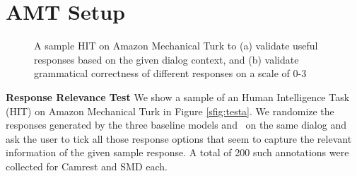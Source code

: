 \section{AMT Setup}
\label{sec:amt_setup}
\begin{figure}[h]
    \centering
    \caption{A sample HIT on Amazon Mechanical Turk to (a) validate useful responses based on the given dialog context, and (b) validate grammatical correctness of different responses on a scale of 0-3}
    \label{fig:amt_rel}
\end{figure}

\noindent \textbf{Response Relevance Test} 
We show a sample of an Human Intelligence Task (HIT) on Amazon Mechanical Turk in Figure \ref{sfig:testa}. We randomize the responses generated by the three baseline models and \sys\ on the same dialog and ask the user to tick all those response options that seem to capture the relevant information of the given sample response. A total of 200 such annotations were collected for Camrest and SMD each.

